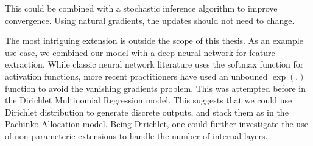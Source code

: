 This could be combined with a stochastic inference algorithm to improve convergence. Using natural gradients, the updates should not need to change.

The most intriguing extension is outside the scope of this thesis. As an example use-case, we combined our model with a deep-neural network for feature extraction. While classic neural network literature\cite{Bishop2006} uses the softmax function for activation functions, more recent practitioners have used an unbouned $\exp(.)$ function to avoid the vanishing gradients problem. This was attempted before in the Dirichlet Multinomial Regression model\cite{Mimno2008}. This suggests that we could use Dirichlet distribution to generate discrete outputs, and stack them as in the Pachinko Allocation model\cite{Li2006}. Being Dirichlet, one could further investigate the use of non-parameteric extensions to handle the number of internal layers.



\clearpage
$\text{ } $
\clearpage
$\text { }$
\clearpage
$\text { }$


